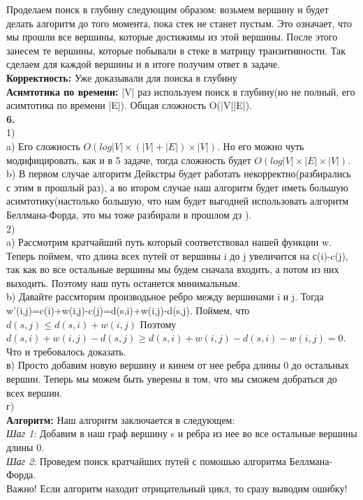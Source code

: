 \documentclass[a4paper,12pt]{article}
\begin{document}
Проделаем поиск в глубину следующим образом: возьмем вершину и будет делать алгоритм до того момента, пока стек не станет пустым. Это означает, что мы прошли все вершины, которые достижимы из этой вершины. После этого занесем те вершины, которые побывали в стеке в матрицу транзитивности. Так сделаем для каждой вершины и в итоге получим ответ в задаче.\\
\textbf{Корректность:} Уже доказывали для поиска в глубину\\
\textbf{Асимтотика по времени:} |V| раз используем поиск в глубину(но не полный, его асимтотика по времени |E|). Общая сложность O(|V||E|).\\
\textbf{6.}\\
1)\\
a) Его сложность $O(log |V| \times(|V|+|E|)\times |V|)$. Но его можно чуть модифицировать, как и в 5 задаче, тогда сложность будет $O(log |V| \times |E| \times |V|).$\\
b) В первом случае алгоритм Дейкстры будет работать некорректно(разбирались с этим в прошлый раз), а во втором случае наш алгоритм будет иметь большую асимтотику(настолько большую, что нам будет выгодней использовать алгоритм Беллмана-Форда, это мы тоже разбирали в прошлом дз ).\\
2)\\
a) Рассмотрим кратчайший путь который соответствовал нашей функции w. Теперь поймем, что длина всех путей от вершины i до j увеличится на с(i)-c(j), так как во все остальные вершины мы будем сначала входить, а потом из них выходить. Поэтому наш путь останется минимальным.\\
b) Давайте рассмторим производьное ребро между вершинами i  и j. Тогда w'(i,j)=c(i)+w(i,j)-c(j)=d(s,i)+w(i,j)-d(s,j). Поймем, что $d(s,j)\leq d(s,i)+w(i,j)$ Поэтому $d(s,i)+w(i,j)-d(s,j)\geq  d(s,i)+ w(i,j)-d(s,i)-w(i,j)=0$. Что и требовалось доказать.\\
в) Просто добавим новую вершину и кинем от нее ребра длины 0 до остальных вершин. Теперь мы можем быть уверены в том, что мы сможем добраться до всех вершин.\\
г)\\
\textbf{Алгоритм:} Наш алгоритм заключается в следующем:\\
\textsl{ Шаг 1}: Добавим в наш граф вершину s и ребра из нее во все остальные вершины длины 0.\\
\textsl{ Шаг 2}: Проведем поиск кратчайших путей с помошью алгоритма Беллмана-Форда.\\
Важно! Если алгоритм находит отрицательный цикл, то сразу выводим ошибку!\\
\end{document}
